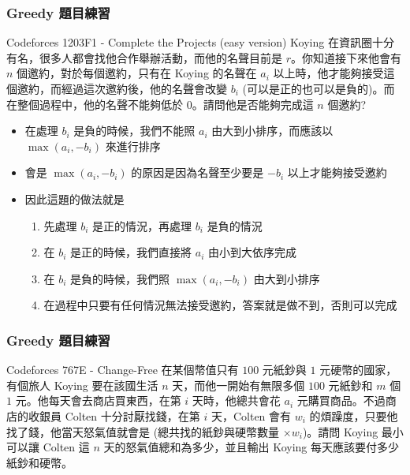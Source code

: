 \documentclass[aspectratio=169]{beamer}
\begin{document}
\begin{frame}
\frametitle{Greedy 題目練習}
    \begin{block}{Codeforces 1203F1 - Complete the Projects (easy version)}
        Koying 在資訊圈十分有名，很多人都會找他合作舉辦活動，而他的名聲目前是 $r$。你知道接下來他會有 $n$ 個邀約，對於每個邀約，只有在 Koying 的名聲在 $a_i$ 以上時，他才能夠接受這個邀約，而經過這次邀約後，他的名聲會改變 $b_i$ (可以是正的也可以是負的)。而在整個過程中，他的名聲不能夠低於 $0$。請問他是否能夠完成這 $n$ 個邀約?
    \end{block}
    \begin{itemize}
        \item<1-> 在處理 $b_i$ 是負的時候，我們不能照 $a_i$ 由大到小排序，而應該以 $\max(a_i,-b_i)$ 來進行排序
        \item<2-> 會是 $\max(a_i,-b_i)$ 的原因是因為名聲至少要是 $-b_i$ 以上才能夠接受邀約
        \item<3-> 因此這題的做法就是
            \begin{enumerate}
                \item 先處理 $b_i$ 是正的情況，再處理 $b_i$ 是負的情況
                \item 在 $b_i$ 是正的時候，我們直接將 $a_i$ 由小到大依序完成
                \item 在 $b_i$ 是負的時候，我們照 $\max(a_i,-b_i)$ 由大到小排序
                \item 在過程中只要有任何情況無法接受邀約，答案就是做不到，否則可以完成
            \end{enumerate}
    \end{itemize}
\end{frame}

\begin{frame}
\frametitle{Greedy 題目練習}
    \begin{block}{Codeforces 767E - Change-Free}
        在某個幣值只有 $100$ 元紙鈔與 $1$ 元硬幣的國家，有個旅人 Koying 要在該國生活 $n$ 天，而他一開始有無限多個 $100$ 元紙鈔和 $m$ 個 $1$ 元。他每天會去商店買東西，在第 $i$ 天時，他總共會花 $a_i$ 元購買商品。不過商店的收銀員 Colten 十分討厭找錢，在第 $i$ 天，Colten 會有 $w_i$ 的煩躁度，只要他找了錢，他當天怒氣值就會是 (總共找的紙鈔與硬幣數量 $\times w_i$)。請問 Koying 最小可以讓 Colten 這 $n$ 天的怒氣值總和為多少，並且輸出 Koying 每天應該要付多少紙鈔和硬幣。
    \end{block}
\end{frame}
\end{document}
